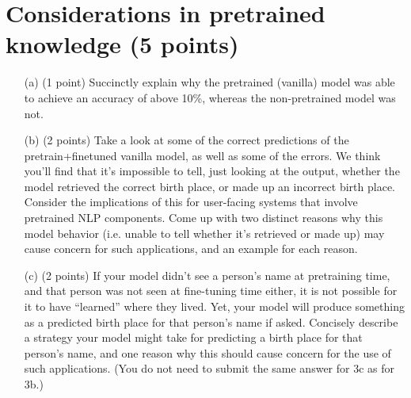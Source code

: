 \documentclass[letterpaper,12pt]{article}
\begin{document}
	
	\section{Considerations in pretrained knowledge (5 points)}
	
	\begin{itemize}
		\item[(a)]
			(1 point) Succinctly explain why the pretrained (vanilla) model was able to achieve an accuracy of above 10\%, whereas the non-pretrained model was not.
		\item[(b)]
			(2 points) Take a look at some of the correct predictions of the pretrain+finetuned vanilla model, as well as some of the errors. We think you'll find that it's impossible to tell, just looking at the output, whether the model retrieved the correct birth place, or made up an incorrect birth place. Consider the implications of this for user-facing systems that involve pretrained NLP components. Come up with two distinct reasons why this model behavior (i.e. unable to tell whether it's retrieved or made up) may cause concern for such applications, and an example for each reason.
		\item[(c)] 
			(2 points) If your model didn't see a person's name at pretraining time, and that person was not seen at fine-tuning time either, it is not possible for it to have “learned” where they lived. Yet, your model will produce something as a predicted birth place for that person's name if asked. Concisely describe a strategy your model might take for predicting a birth place for that person's name, and one reason why this should cause concern for the use of such applications. (You do not need to submit the same answer for 3c as for 3b.)
	\end{itemize}
	
	
	
\end{document}
